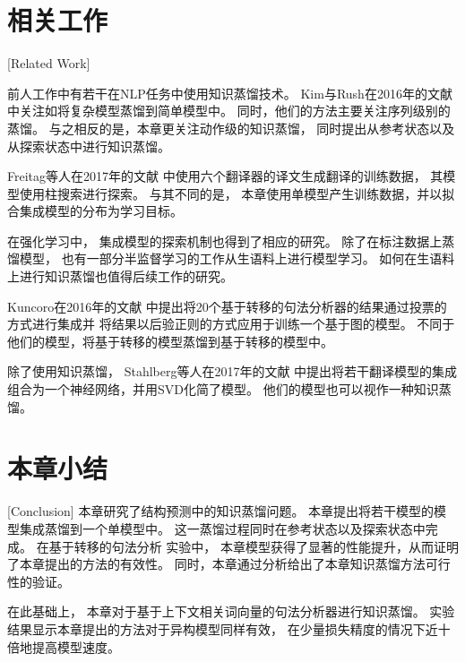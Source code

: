\section{相关工作}[Related Work]

前人工作中有若干在NLP任务中使用知识蒸馏技术。
Kim与Rush在2016年的文献
中关注如将复杂模型蒸馏到简单模型中。
同时，他们的方法主要关注序列级别的蒸馏。
与之相反的是，本章更关注动作级的知识蒸馏，
同时提出从参考状态以及从探索状态中进行知识蒸馏。

Freitag等人在2017年的文献
中使用六个翻译器的译文生成翻译的训练数据，
其模型使用柱搜索进行探索。
与其不同的是，
本章使用单模型产生训练数据，并以拟合集成模型的分布为学习目标。

在强化学习中，
集成模型的探索机制也得到了相应的研究\cite{NIPS2016_6501}。
除了在标注数据上蒸馏模型，
也有一部分半监督学习的工作从生语料上进行模型学习\cite{liang:icml08,li-zhang-chen:2014:P14-1}。
如何在生语料上进行知识蒸馏也值得后续工作的研究。

Kuncoro在2016年的文献
中提出将20个基于转移的句法分析器的结果通过投票的方式进行集成并
将结果以后验正则的方式应用于训练一个基于图的模型。
不同于他们的模型，将基于转移的模型蒸馏到基于转移的模型中。

除了使用知识蒸馏，
Stahlberg等人在2017年的文献
中提出将若干翻译模型的集成组合为一个神经网络，并用SVD化简了模型。
他们的模型也可以视作一种知识蒸馏。

\section{本章小结}[Conclusion]
本章研究了结构预测中的知识蒸馏问题。
本章提出将若干模型的模型集成蒸馏到一个单模型中。
这一蒸馏过程同时在参考状态以及探索状态中完成。
在基于转移的句法分析
实验中，
本章模型获得了显著的性能提升，从而证明了本章提出的方法的有效性。
同时，本章通过分析给出了本章知识蒸馏方法可行性的验证。

在此基础上，
本章对于基于上下文相关词向量的句法分析器进行知识蒸馏。
实验结果显示本章提出的方法对于异构模型同样有效，
在少量损失精度的情况下近十倍地提高模型速度。